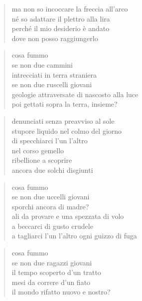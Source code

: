	\begin{verse}
		ma non so incoccare la freccia all'arco\\
		né so adattare il plettro alla lira\\
		perché il mio desiderio è andato\\
		dove non posso raggiungerlo
	\end{verse}

\clearpage


	\begin{verse}
		cosa fummo\\
		se non due cammini\\
		intrecciati in terra straniera\\
		se non due ruscelli giovani\\
		geologie attraversate di nascosto alla luce\\
		poi gettati sopra la terra, insieme?
	\end{verse}

	\begin{verse}
		denunciati senza preavviso al sole\\
		stupore liquido nel colmo del giorno\\
		di specchiarci l'un l'altro\\
		nel corso gemello\\
		ribellione a scoprire\\
		ancora due solchi disgiunti
	\end{verse}

	\begin{verse}
		cosa fummo\\
		se non due uccelli giovani\\
		sporchi ancora di madre?\\
		ali da provare e una spezzata di volo\\
		a beccarci di gusto crudele\\
		a tagliarci l'un l'altro ogni guizzo di fuga
	\end{verse}

	\begin{verse}
		cosa fummo\\
		se non due ragazzi giovani\\
		il tempo scoperto d'un tratto\\
		mesi da correre d'un fiato\\
		il mondo rifatto nuovo e nostro?
	\end{verse}
	
